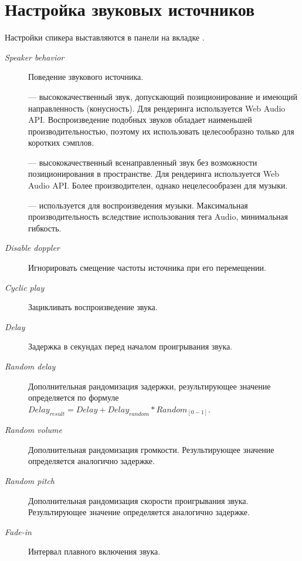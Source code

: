 \documentclass[a4paper,12pt,oneside]{sphinxmanual}
\begin{document}
\section{Настройка звуковых источников}
\label{audio:id2}
Настройки спикера выставляются в панели  на вкладке .
\begin{description}
\item[{\emph{Speaker behavior}}] \leavevmode
Поведение звукового источника.

 --- высококачественный звук, допускающий позиционирование и
имеющий направленность (конусность). Для рендеринга используется Web Audio
API. Воспроизведение подобных звуков обладает наименьшей производительностью,
поэтому их использовать целесообразно только для коротких сэмплов.

 --- высококачественный всенаправленный звук без возможности
позиционирования в пространстве. Для рендеринга используется Web Audio API.
Более производителен, однако нецелесообразен для музыки.

 --- используется для воспроизведения музыки. Максимальная
производительность вследствие использования тега Audio, минимальная гибкость.

\item[{\emph{Disable doppler}}] \leavevmode
Игнорировать смещение частоты источника при его перемещении.

\item[{\emph{Cyclic play}}] \leavevmode
Зацикливать воспроизведение звука.

\item[{\emph{Delay}}] \leavevmode
Задержка в секундах перед началом проигрывания звука.

\item[{\emph{Random delay}}] \leavevmode
Дополнительная рандомизация задержки, результирующее значение определяется
по формуле \(Delay_{result} = Delay + Delay_{random} * Random_{[0-1]}\).

\item[{\emph{Random volume}}] \leavevmode
Дополнительная рандомизация громкости. Результирующее значение определяется
аналогично задержке.

\item[{\emph{Random pitch}}] \leavevmode
Дополнительная рандомизация скорости проигрывания звука. Результирующее значение определяется
аналогично задержке.

\item[{\emph{Fade-in}}] \leavevmode
Интервал плавного включения звука.


\end{description}
\end{document}
